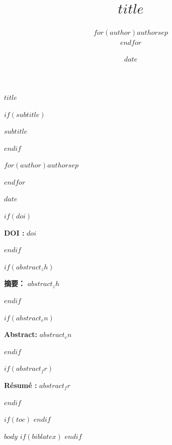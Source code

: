 \documentclass[11pt]{article}
\title{$title$}
\author{$for(author)$$author$$sep$ \\ $endfor$}
\date{$date$}
\newcommand{\doclang}{en} %
\newcommand{\ifdoclang}[3]{%
  \ifstrequal{\doclang}{#1}{#2}{#3}%
}
\theoremstyle{definition} %
\theoremstyle{plain} %
\theoremstyle{remark} %
\renewcommand{\maketitle}{
  \begin{center}
  \vspace*{1cm}
  
  \begin{minipage}{\textwidth}
  \centering
  \fontsize{20}{26}\selectfont\textbf{$title$}
  \end{minipage}
  
  \vspace{0.4cm}
  
  $if(subtitle)$   \begin{minipage}{\textwidth}
  \centering
  \fontsize{13}{16}\selectfont\itshape $subtitle$   \end{minipage}
  $endif$   
  \vspace{0.6cm}
  
  \begin{minipage}{\textwidth}
  \centering
  \Large
  $for(author)$$author$$sep$ \par $endfor$   \end{minipage}
  
  \vspace{0.6cm}
  
  \Large $date$   
  \end{center}
  \vspace{1cm}
}
\begin{document}
\maketitle

 $if(doi)$ 
\vspace{-0.5cm}
\begin{center}
\small\textbf{\ifdoclang{zh}{DOI：}{DOI :}} \href{https://doi.org/$doi$}{$doi$}
\end{center}
\vspace{0.5cm}
 $endif$ 
\thispagestyle{firstpage}

 $if(abstract_zh)$ \begin{center}
\begin{minipage}{0.85\textwidth}
\noindent \textbf{摘要：} $abstract_zh$ \end{minipage}
\end{center}
\vspace{1cm}
 $endif$ 


 $if(abstract_en)$ \begin{center}
\begin{minipage}{0.85\textwidth}
\noindent \textbf{Abstract:} $abstract_en$ \end{minipage}
\end{center}
\vspace{1cm}
 $endif$ 

 
 $if(abstract_fr)$ \begin{center}
\begin{minipage}{0.85\textwidth}
\noindent \textbf{Résumé :} $abstract_fr$ \end{minipage}
\end{center}
\vspace{1cm}
 $endif$ 
  
 $if(toc)$ \clearpage
\tableofcontents
\clearpage
 $endif$ 
\pagestyle{fancy}

 $body$ 
 $if(biblatex)$ 
 $endif$ 

\clearpage
\printunsrtglossary[type=concepts, title={Index des concepts}]
\clearpage
\printunsrtglossary[type=motscles, title={Index des mots-clés}]   %
\clearpage
\printunsrtglossary[type=notations, title={Index des notations}]
\end{document}
